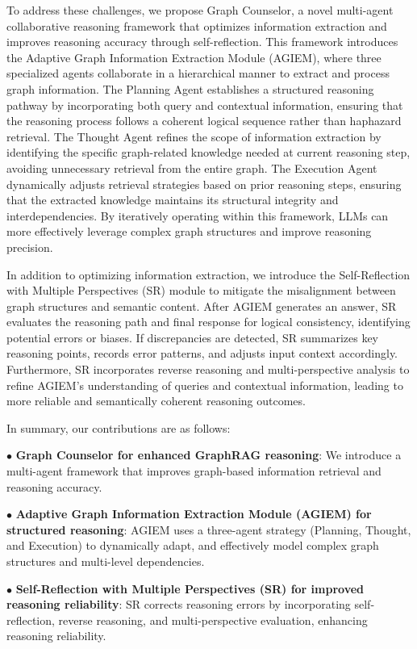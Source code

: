 \documentclass[11pt]{article}
\begin{document}
To address these challenges, we propose Graph Counselor, a novel multi-agent collaborative reasoning framework that optimizes information extraction and improves reasoning accuracy through self-reflection. This framework introduces the Adaptive Graph Information Extraction Module (AGIEM), where three specialized agents collaborate in a hierarchical manner to extract and process graph information. The Planning Agent establishes a structured reasoning pathway by incorporating both query and contextual information, ensuring that the reasoning process follows a coherent logical sequence rather than haphazard retrieval. The Thought Agent refines the scope of information extraction by identifying the specific graph-related knowledge needed at current reasoning step, avoiding unnecessary retrieval from the entire graph. The Execution Agent dynamically adjusts retrieval strategies based on prior reasoning steps, ensuring that the extracted knowledge maintains its structural integrity and interdependencies. By iteratively operating within this framework, LLMs can more effectively leverage complex graph structures and improve reasoning precision.

In addition to optimizing information extraction, we introduce the Self-Reflection with Multiple Perspectives (SR) module to mitigate the misalignment between graph structures and semantic content. After AGIEM generates an answer, SR evaluates the reasoning path and final response for logical consistency, identifying potential errors or biases. If discrepancies are detected, SR summarizes key reasoning points, records error patterns, and adjusts input context accordingly. Furthermore, SR incorporates reverse reasoning and multi-perspective analysis to refine AGIEM’s understanding of queries and contextual information, leading to more reliable and semantically coherent reasoning outcomes.


In summary, our contributions are as follows:

$\bullet$ \textbf{Graph Counselor for enhanced GraphRAG reasoning}: We introduce a multi-agent framework that improves graph-based information retrieval and reasoning accuracy.

$\bullet$ \textbf{Adaptive Graph Information Extraction Module (AGIEM) for structured reasoning}: AGIEM uses a three-agent strategy (Planning, Thought, and Execution) to dynamically adapt, and effectively model complex graph structures and multi-level dependencies.

$\bullet$ \textbf{Self-Reflection with Multiple Perspectives (SR) for improved reasoning reliability}: SR corrects reasoning errors by incorporating self-reflection, reverse reasoning, and multi-perspective evaluation, enhancing reasoning reliability.
\end{document}
